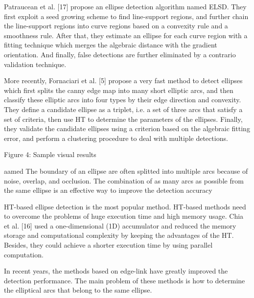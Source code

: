\documentclass[a4paper]{report}
\begin{document}
Patraucean
et al. [17] propose an ellipse detection algorithm named ELSD. They first exploit a seed
growing scheme to find line-support regions, and further chain the line-support regions into
curve regions based on a convexity rule and a smoothness rule. After that, they estimate an
ellipse for each curve region with a fitting technique which merges the algebraic distance
with the gradient orientation. And finally, false detections are further eliminated by a contrario
validation technique. 

More recently, Fornaciari et al. [5] propose a very fast method
to detect ellipses which first splits the canny edge map into many short elliptic arcs, and then
classify these elliptic arcs into four types by their edge direction and convexity. They define
a candidate ellipse as a triplet, i.e. a set of three arcs that satisfy a set of criteria, then use
HT to determine the parameters of the ellipses. Finally, they validate the candidate ellipses
using a criterion based on the algebraic fitting error, and perform a clustering procedure to
deal with multiple detections.


Figure 4: Sample visual results




aamed
The boundary of an ellipse are often splitted
into multiple arcs because of noise, overlap, and occlusion.
The combination of as many arcs as possible from the same
ellipse is an effective way to improve the detection accuracy

HT-based ellipse detection is the most popular method.
HT-based methods need to overcome the problems of huge
execution time and high memory usage.
Chia et al. [16]
used a one-dimensional (1D) accumulator and reduced the
memory storage and computational complexity by keeping
the advantages of the HT. Besides, they could achieve a
shorter execution time by using parallel computation.

In recent years, the methods based on edge-link have greatly
improved the detection performance. The main problem of
these methods is how to determine the elliptical arcs that
belong to the same ellipse.
\end{document}
